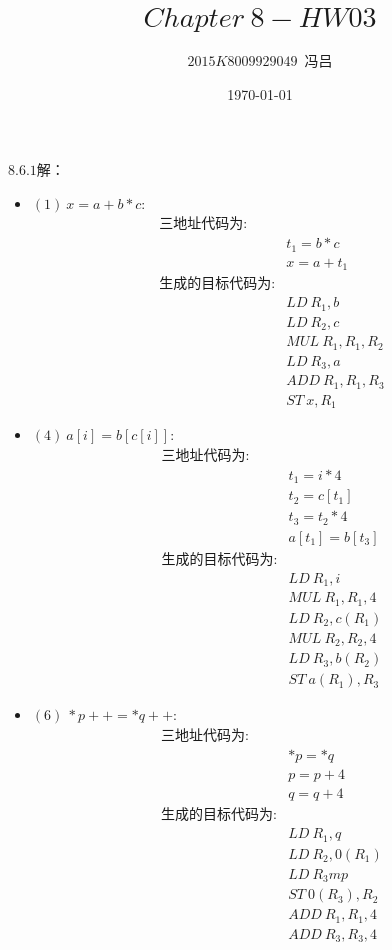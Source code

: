 \documentclass[UTF8,noindent]{ctexart}
\title{$Chapter\ 8-HW03$}
\author{$2015K8009929049$\ 冯吕}
\date{\today}
\begin{document}
\maketitle
{}
$8.6.1$解：
\begin{itemize}
  \item $(1)\ x = a + b*c$:
	\begin{align*}
	  \text{三地址代码为}:&\\
	  &t_1 = b *c\\
	  &x = a + t_1\\
	  \text{生成的目标代码为}:&\\
	  &LD\ R_1, b\\
	  &LD\ R_2, c\\
	  &MUL\ R_1, R_1, R_2\\
	  &LD\ R_3, a\\
	  &ADD\ R_1, R_1, R_3\\
	  &ST\ x, R_1
	\end{align*}
  \item $(4)\ a[i] = b[c[i]]$:
	\begin{align*}
	  \text{三地址代码为}:&\\
	  &t_1 = i*4\\
	  &t_2 = c[t_1]\\
	  &t_3 = t_2 *4\\
	  &a[t_1] = b[t_3]\\
	  \text{生成的目标代码为}:&\\
	  &LD\ R_1, i\\
	  &MUL\ R_1, R_1, 4\\
	  &LD\ R_2, c(R_1)\\
	  &MUL\ R_2, R_2, 4\\
	  &LD\ R_3, b(R_2)\\
	  &ST\ a(R_1), R_3
	\end{align*}
  \item $(6)\ *p++ = *q++$:
	\begin{align*}
	  \text{三地址代码为}:&\\
	  &*p = *q\\
	  &p = p+4\\
	  &q = q+4\\
	\text{生成的目标代码为}:&\\
	&LD\ R_1, q\\
	&LD\ R_2, 0(R_1)\\
	&LD\ R_3m p\\
	&ST\ 0(R_3), R_2\\
	&ADD\ R_1, R_1, 4\\
	& ADD\ R_3, R_3, 4
	\end{align*}
\end{itemize}
\end{document}
